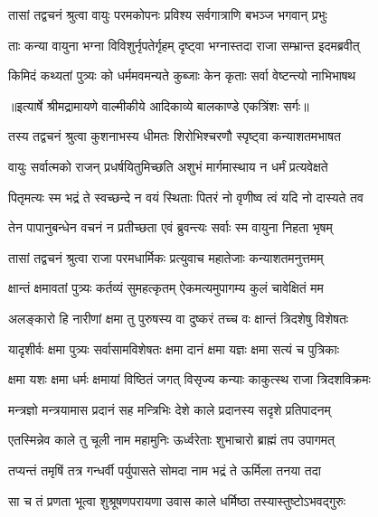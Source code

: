 \twolineshloka
{तासां तद्वचनं श्रुत्वा वायुः परमकोपनः}
{प्रविश्य सर्वगात्राणि बभञ्ज भगवान् प्रभुः} %

\twolineshloka
{ताः कन्या वायुना भग्ना विविशुर्नृपतेर्गृहम्}
{दृष्ट्वा भग्नास्तदा राजा सम्भ्रान्त इदमब्रवीत्} %

\twolineshloka
{किमिदं कथ्यतां पुत्र्यः को धर्ममवमन्यते}
{कुब्जाः केन कृताः सर्वा वेष्टन्त्यो नाभिभाषथ} %


{॥इत्यार्षे श्रीमद्रामायणे वाल्मीकीये आदिकाव्ये बालकाण्डे एकत्रिंशः सर्गः॥}


\twolineshloka
{तस्य तद्वचनं श्रुत्वा कुशनाभस्य धीमतः}
{शिरोभिश्चरणौ स्पृष्ट्वा कन्याशतमभाषत} %

\twolineshloka
{वायुः सर्वात्मको राजन् प्रधर्षयितुमिच्छति}
{अशुभं मार्गमास्थाय न धर्मं प्रत्यवेक्षते} %

\twolineshloka
{पितृमत्यः स्म भद्रं ते स्वच्छन्दे न वयं स्थिताः}
{पितरं नो वृणीष्व त्वं यदि नो दास्यते तव} %

\twolineshloka
{तेन पापानुबन्धेन वचनं न प्रतीच्छता}
{एवं ब्रुवन्त्यः सर्वाः स्म वायुना निहता भृषम्} %

\twolineshloka
{तासां तद्वचनं श्रुत्वा राजा परमधार्मिकः}
{प्रत्युवाच महातेजाः कन्याशतमनुत्तमम्} %

\twolineshloka
{क्षान्तं क्षमावतां पुत्र्यः कर्तव्यं सुमहत्कृतम्}
{ऐकमत्यमुपागम्य कुलं चावेक्षितं मम} %

\twolineshloka
{अलङ्कारो हि नारीणां क्षमा तु पुरुषस्य वा}
{दुष्करं तच्च वः क्षान्तं त्रिदशेषु विशेषतः} %

\twolineshloka
{यादृशीर्वः क्षमा पुत्र्यः सर्वासामविशेषतः}
{क्षमा दानं क्षमा यज्ञः क्षमा सत्यं च पुत्रिकाः} %

\twolineshloka
{क्षमा यशः क्षमा धर्मः क्षमायां विष्ठितं जगत्}
{विसृज्य कन्याः काकुत्स्थ राजा त्रिदशविक्रमः} %

\twolineshloka
{मन्त्रज्ञो मन्त्रयामास प्रदानं सह मन्त्रिभिः}
{देशे काले प्रदानस्य सदृशे प्रतिपादनम्} %

\twolineshloka
{एतस्मिन्नेव काले तु चूली नाम महामुनिः}
{ऊर्ध्वरेताः शुभाचारो ब्राह्मं तप उपागमत्} %

\twolineshloka
{तप्यन्तं तमृषिं तत्र गन्धर्वी पर्युपासते}
{सोमदा नाम भद्रं ते ऊर्मिला तनया तदा} %

\twolineshloka
{सा च तं प्रणता भूत्वा शुश्रूषणपरायणा}
{उवास काले धर्मिष्ठा तस्यास्तुष्टोऽभवद्गुरुः} %

